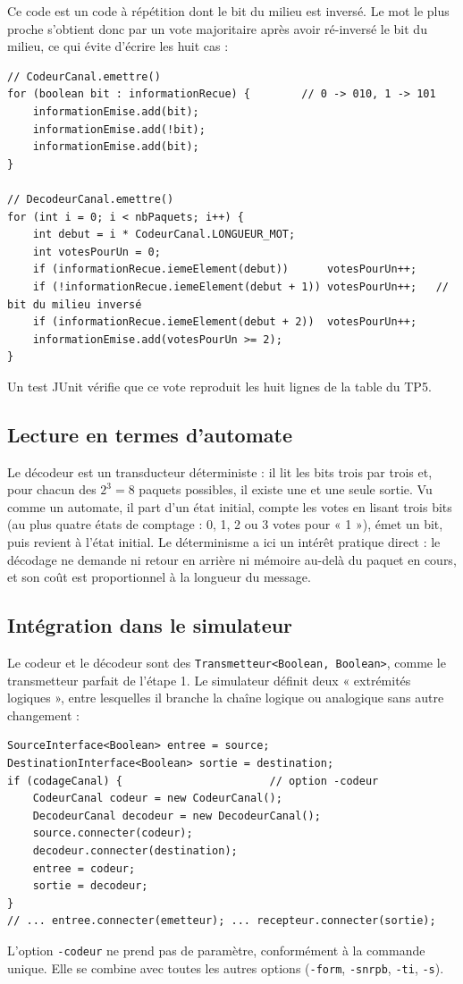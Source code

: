 \documentclass[11pt,a4paper]{article}
\begin{document}
Ce code est un code à répétition dont le bit du milieu est inversé. Le mot le plus proche s'obtient donc par un vote majoritaire après avoir ré-inversé le bit du milieu, ce qui évite d'écrire les huit cas :
\begin{lstlisting}
// CodeurCanal.emettre()
for (boolean bit : informationRecue) {        // 0 -> 010, 1 -> 101
    informationEmise.add(bit);
    informationEmise.add(!bit);
    informationEmise.add(bit);
}

// DecodeurCanal.emettre()
for (int i = 0; i < nbPaquets; i++) {
    int debut = i * CodeurCanal.LONGUEUR_MOT;
    int votesPourUn = 0;
    if (informationRecue.iemeElement(debut))      votesPourUn++;
    if (!informationRecue.iemeElement(debut + 1)) votesPourUn++;   // bit du milieu inversé
    if (informationRecue.iemeElement(debut + 2))  votesPourUn++;
    informationEmise.add(votesPourUn >= 2);
}
\end{lstlisting}
Un test JUnit vérifie que ce vote reproduit les huit lignes de la table du TP5.

\subsection{Lecture en termes d'automate}
Le décodeur est un transducteur déterministe : il lit les bits trois par trois et, pour chacun des $2^3 = 8$ paquets possibles, il existe une et une seule sortie. Vu comme un automate, il part d'un état initial, compte les votes en lisant trois bits (au plus quatre états de comptage : 0, 1, 2 ou 3 votes pour « 1 »), émet un bit, puis revient à l'état initial. Le déterminisme a ici un intérêt pratique direct : le décodage ne demande ni retour en arrière ni mémoire au-delà du paquet en cours, et son coût est proportionnel à la longueur du message.

\subsection{Intégration dans le simulateur}
Le codeur et le décodeur sont des \texttt{Transmetteur<Boolean, Boolean>}, comme le transmetteur parfait de l'étape 1. Le simulateur définit deux « extrémités logiques », entre lesquelles il branche la chaîne logique ou analogique sans autre changement :
\begin{lstlisting}
SourceInterface<Boolean> entree = source;
DestinationInterface<Boolean> sortie = destination;
if (codageCanal) {                       // option -codeur
    CodeurCanal codeur = new CodeurCanal();
    DecodeurCanal decodeur = new DecodeurCanal();
    source.connecter(codeur);
    decodeur.connecter(destination);
    entree = codeur;
    sortie = decodeur;
}
// ... entree.connecter(emetteur); ... recepteur.connecter(sortie);
\end{lstlisting}
L'option \texttt{-codeur} ne prend pas de paramètre, conformément à la commande unique. Elle se combine avec toutes les autres options (\texttt{-form}, \texttt{-snrpb}, \texttt{-ti}, \texttt{-s}).
\end{document}
